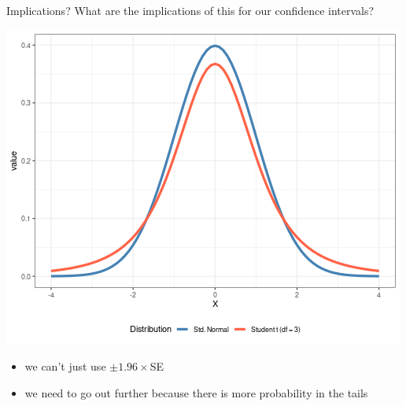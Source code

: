 \documentclass{beamer}
\begin{document}
\begin{frame}{Implications?}
What are the implications of this for our confidence intervals? \vspace{4mm}

\begin{center}
\includegraphics[scale=0.4]{t3.png}
\end{center}
\begin{itemize}
    \item we can't just use $\pm 1.96 \times$SE
    \item we need to go out further because there is more probability in the tails
\end{itemize}
\end{frame}
\end{document}
